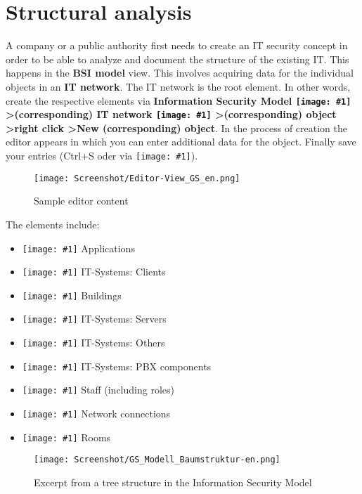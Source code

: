 \documentclass[a4paper,10pt]{book}
\newcommand{\icon}[1]{\texttt{[image: \#1]}}
\begin{document}
\section{Structural analysis} \label{sec:StructuralAnalysis}
A company or a public authority first needs to create an IT security concept in order to be able to analyze and document the structure of the existing IT. This happens in the \textbf{BSI model} view. This involves acquiring data for the individual objects in an \textbf{IT network}. The IT network is the root element.
In other words, create the respective elements via
\textbf{Information Security Model
\icon{Icon/GS_Modell.png} \textgreater (corresponding) IT network
\icon{Icon/GS_Modell.png} \textgreater (corresponding) object
\textgreater right click \textgreater New (corresponding) object}.
In the process of creation the editor appears in which you can enter additional data for the object. Finally save your entries (Ctrl+S oder via \icon{Icon/Disk.png}).
\newline
\begin{figure}[htb!]
  \centering
  \texttt{[image: Screenshot/Editor-View\_GS\_en.png]}
  \caption{\label{Sample editor content} Sample editor content}
\end{figure}
\newline
The elements include:
\begin{itemize}
 \item \icon{Icon/Anwendung.png} Applications
 \item \icon{Icon/Clients.png} IT-Systems: Clients
 \item \icon{Icon/Gebaeude.png} Buildings
 \item \icon{Icon/Server.png} IT-Systems: Servers
 \item \icon{Icon/Sonstige.png} IT-Systems: Others
 \item \icon{Icon/Tk_komponenten.png} IT-Systems: PBX components
 \item \icon{Icon/Mitarbeiter.png} Staff (including roles)
 \item \icon{Icon/Netzwerkverbindungen.png} Network connections
 \item \icon{Icon/Raeume.png} Rooms
\end{itemize}
\begin{figure}[htb!]
  \centering
  \texttt{[image: Screenshot/GS\_Modell\_Baumstruktur-en.png]}
  \caption{\label{Excerpt from a tree structure in the Information Security Model} Excerpt from a tree structure in the Information Security Model}
\end{figure}
\end{document}
